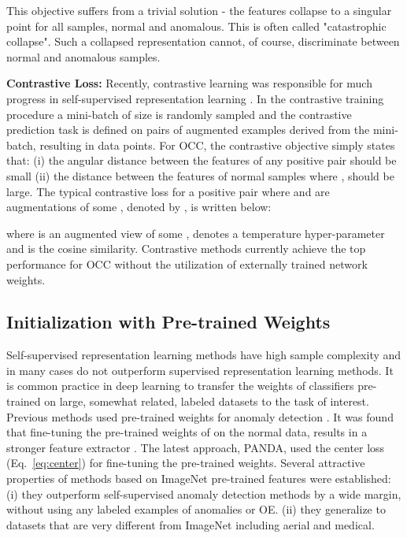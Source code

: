 \documentclass[letterpaper]{article} \usepackage{aaai23}  \usepackage{times}  \usepackage{helvet}  \usepackage{courier}  \usepackage[hyphens]{url}  \usepackage{graphicx} \usepackage{amsmath, amssymb}
\begin{document}
This objective suffers from a trivial solution - the features  collapse to a singular point  for all samples, normal and anomalous. This is often called "catastrophic collapse". Such a collapsed representation cannot, of course, discriminate between normal and anomalous samples.

\textbf{Contrastive Loss:} Recently, contrastive learning was responsible for much progress in self-supervised representation learning \cite{chen2020simple}. In the contrastive training procedure a mini-batch of size  is randomly sampled and the contrastive prediction task is defined on pairs of augmented examples derived from the mini-batch, resulting in  data points. For OCC, the contrastive objective simply states that: (i) the angular distance between the features of any positive pair  should be small (ii) the distance between the features of normal samples  where , should be large. The typical contrastive loss for a positive pair  where  and  are augmentations of some , denoted by , is written below:

where  is an augmented view of some ,  denotes a temperature hyper-parameter and  is the cosine similarity. Contrastive methods currently achieve the top performance for OCC without the utilization of externally trained network weights.

\subsection{Initialization with Pre-trained Weights}
\label{sec:background:pre-trained}

Self-supervised representation learning methods have high sample complexity and in many cases do not outperform supervised representation learning methods. It is common practice in deep learning to transfer the weights of classifiers pre-trained on large, somewhat related, labeled datasets to the task of interest. Previous methods used pre-trained weights for anomaly detection \cite{perera2019learning,reiss2021panda}. It was found that fine-tuning the pre-trained weights of  on the normal data, results in a stronger feature extractor . The latest approach, PANDA, used the center loss (Eq.~\ref{eq:center}) for fine-tuning the pre-trained weights. Several attractive properties of methods based on ImageNet pre-trained features were established: (i) they outperform self-supervised anomaly detection methods by a wide margin, without using any labeled examples of anomalies or OE. (ii) they generalize to datasets that are very different from ImageNet including aerial and medical.
\end{document}
